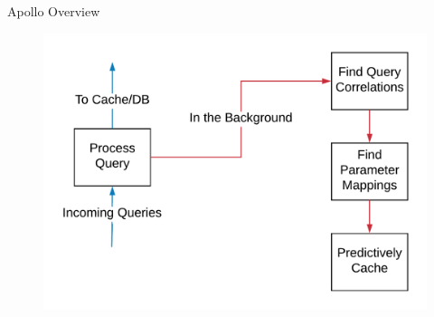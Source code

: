 \documentclass[12pt]{beamer}
\begin{document}

\begin{frame}[fragile]{Apollo Overview}
    \begin{figure}
        \includegraphics[scale=0.18]{apollo_overview_simplified}
    \end{figure}
\end{frame}
\end{document}
